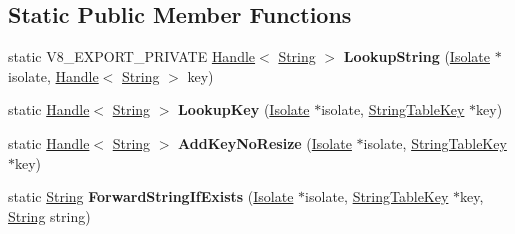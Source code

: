 \subsection*{Static Public Member Functions}
\begin{DoxyCompactItemize}
\item 
\mbox{\label{classv8_1_1internal_1_1StringTable_a1e5bbfa11d1d3e127cf8040931b9e55e}} 
static V8\+\_\+\+E\+X\+P\+O\+R\+T\+\_\+\+P\+R\+I\+V\+A\+TE \mbox{\hyperlink{classv8_1_1internal_1_1Handle}{Handle}}$<$ \mbox{\hyperlink{classv8_1_1internal_1_1String}{String}} $>$ {\bfseries Lookup\+String} (\mbox{\hyperlink{classv8_1_1internal_1_1Isolate}{Isolate}} $\ast$isolate, \mbox{\hyperlink{classv8_1_1internal_1_1Handle}{Handle}}$<$ \mbox{\hyperlink{classv8_1_1internal_1_1String}{String}} $>$ key)
\item 
\mbox{\label{classv8_1_1internal_1_1StringTable_a3e911a9cf1e7d30970d875a65ba280a1}} 
static \mbox{\hyperlink{classv8_1_1internal_1_1Handle}{Handle}}$<$ \mbox{\hyperlink{classv8_1_1internal_1_1String}{String}} $>$ {\bfseries Lookup\+Key} (\mbox{\hyperlink{classv8_1_1internal_1_1Isolate}{Isolate}} $\ast$isolate, \mbox{\hyperlink{classv8_1_1internal_1_1StringTableKey}{String\+Table\+Key}} $\ast$key)
\item 
\mbox{\label{classv8_1_1internal_1_1StringTable_a03979655eedfe70a81b2fb6984aed690}} 
static \mbox{\hyperlink{classv8_1_1internal_1_1Handle}{Handle}}$<$ \mbox{\hyperlink{classv8_1_1internal_1_1String}{String}} $>$ {\bfseries Add\+Key\+No\+Resize} (\mbox{\hyperlink{classv8_1_1internal_1_1Isolate}{Isolate}} $\ast$isolate, \mbox{\hyperlink{classv8_1_1internal_1_1StringTableKey}{String\+Table\+Key}} $\ast$key)
\item 
\mbox{\label{classv8_1_1internal_1_1StringTable_a55f9ba90435a78966f794c5e65820043}} 
static \mbox{\hyperlink{classv8_1_1internal_1_1String}{String}} {\bfseries Forward\+String\+If\+Exists} (\mbox{\hyperlink{classv8_1_1internal_1_1Isolate}{Isolate}} $\ast$isolate, \mbox{\hyperlink{classv8_1_1internal_1_1StringTableKey}{String\+Table\+Key}} $\ast$key, \mbox{\hyperlink{classv8_1_1internal_1_1String}{String}} string)
\item 
\mbox{\label{classv8_1_1internal_1_1StringTable_aab6e0d1733e279f389ef50328047038e}} 

\end{DoxyCompactItemize}
